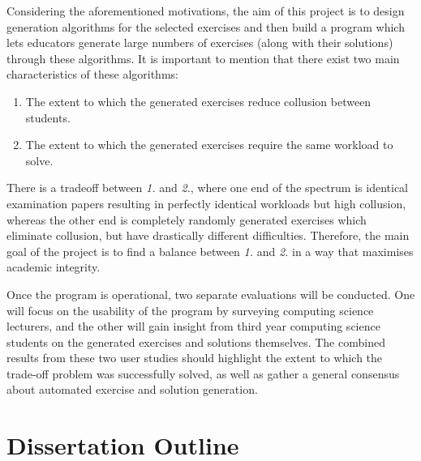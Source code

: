 \documentclass{l4proj}
\begin{document}
Considering the aforementioned motivations, the aim of this project is to design generation algorithms for the selected exercises and then build a program which lets educators generate large numbers of exercises (along with their solutions) through these algorithms. It is important to mention that there exist two main characteristics of these algorithms:
\begin{enumerate}
	\item
	The extent to which the generated exercises reduce collusion between students.
	\item
	The extent to which the generated exercises require the same workload to solve.
\end{enumerate}
There is a tradeoff between \emph{1.} and \emph{2.}, where one end of the spectrum is identical examination papers resulting in perfectly identical workloads but high collusion, whereas the other end is completely randomly generated exercises which eliminate collusion, but have drastically different difficulties. Therefore, the main goal of the project is to find a balance between \emph{1.} and \emph{2.} in a way that maximises academic integrity.

Once the program is operational, two separate evaluations will be conducted. One will focus on the usability of the program by surveying computing science lecturers, and the other will gain insight from third year computing science students on the generated exercises and solutions themselves. The combined results from these two user studies should highlight the extent to which the trade-off problem was successfully solved, as well as gather a general consensus about automated exercise and solution generation.

\section {Dissertation Outline}
\end{document}
